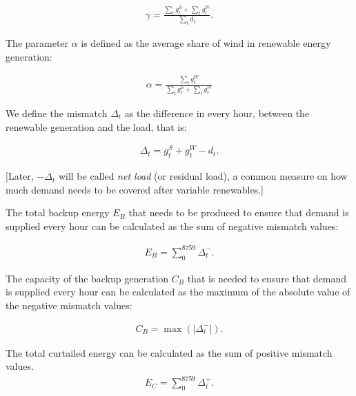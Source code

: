 \documentclass[10pt]{article}
\begin{document}
\begin{align}
	\gamma=\frac{\sum_t g_t^S + \sum_t g_t^W}{\sum_t d_t}.
\end{align}

The parameter $\alpha$ is defined as the average share of wind in renewable energy generation:

\begin{align}
	\alpha=\frac{\sum_t g_t^W}{\sum_t g_t^S + \sum_t g_t^W}
\end{align}

We define the mismatch $\Delta_t$ as the difference in every hour, between the renewable generation and the load, that is:

\begin{align}
	\Delta_t=g_t^S+g_t^W-d_t.
\end{align}

[Later, $-\Delta_t$ will be called \emph{net load} (or residual load), a common measure on how much demand needs to be covered after variable renewables.]

The total backup energy $E_B$ that needs to be produced to ensure that demand is supplied every hour can be calculated as the sum of negative mismatch values:

\begin{align}
	E_B=\sum_0^{8759} \Delta_t^{-}.
\end{align}


The capacity of the backup generation $C_B$ that is needed to ensure that demand is supplied every hour can be calculated as the maximum of the absolute value of the negative mismatch values:

\begin{align}
	C_B=\max(|{\Delta_t^-}|).
\end{align}


The total curtailed energy can be calculated as the sum of positive mismatch values. 
\begin{align}
	E_C=\sum_0^{8759} \Delta_t^{+}.
\end{align}
\end{document}
